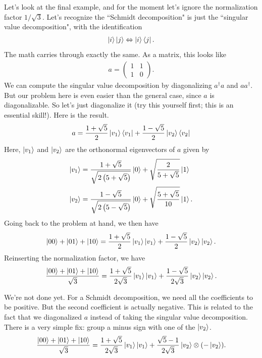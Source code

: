 \documentclass{book}
\begin{document}
    Let's look at the final example, and for the moment let's ignore the normalization factor $1/\sqrt{3}$. Let's recognize the ``Schmidt decomposition" is just the ``singular value decomposition", with the identification
    \begin{align}
        \ket{i}\ket{j} \Leftrightarrow \ket{i}\bra{j}.
    \end{align}
    The math carries through exactly the same. As a matrix, this looks like
    \begin{align}
        a = \begin{pmatrix}
            1 & 1 \\
            1 & 0
        \end{pmatrix}.
    \end{align}
    We can compute the singular value decomposition by diagonalizing $a^\dagger a$ and $a a^\dagger$. But our problem here is even easier than the general case, since $a$ is diagonalizable. So let's just diagonalize it (try this yourself first; this is an essential skill!). Here is the result.
    \begin{align}
        a = \frac{1 + \sqrt{5}}{2} \ket{v_1}\bra{v_1} + \frac{1-\sqrt{5}}{2} \ket{v_2}\bra{v_2}
    \end{align}
    Here, $\ket{v_1}$ and $\ket{v_2}$ are the orthonormal eigenvectors of $a$ given by
    \begin{align}
    \begin{aligned}
        \ket{v_1} &= \frac{1 + \sqrt{5}}{\sqrt{2\left(5 + \sqrt{5}\right)}} \ket{0} + \sqrt{\frac{2}{5 + \sqrt{5}}} \ket{1} \\
        \ket{v_2} &= \frac{1-\sqrt{5}}{\sqrt{2\left(5-\sqrt{5}\right)}} \ket{0} + \sqrt{\frac{5 + \sqrt{5}}{10}} \ket{1}.
    \end{aligned}
    \end{align}
    Going back to the problem at hand, we then have
    \begin{align}
        \ket{00} + \ket{01} + \ket{10} = \frac{1 + \sqrt{5}}{2} \ket{v_1}\ket{v_1} + \frac{1-\sqrt{5}}{2} \ket{v_2}\ket{v_2}.
    \end{align}
    Reinserting the normalization factor, we have
    \begin{align}
        \frac{\ket{00} + \ket{01} + \ket{10}}{\sqrt{3}} = \frac{1 + \sqrt{5}}{2\sqrt{3}} \ket{v_1}\ket{v_1} + \frac{1-\sqrt{5}}{2\sqrt{3}} \ket{v_2}\ket{v_2}.
    \end{align}

    We're not done yet. For a Schmidt decomposition, we need all the coefficients to be positive. But the second coefficient is actually negative. This is related to the fact that we diagonalized $a$ instead of taking the singular value decomposition. There is a very simple fix: group a minus sign with one of the $\ket{v_2}$.
    \begin{align}
        \frac{\ket{00} + \ket{01} + \ket{10}}{\sqrt{3}} = \frac{1 + \sqrt{5}}{2\sqrt{3}} \ket{v_1}\ket{v_1} + \frac{\sqrt{5}-1}{2\sqrt{3}} \ket{v_2}\otimes(-\ket{v_2}).
    \end{align}
\end{document}
